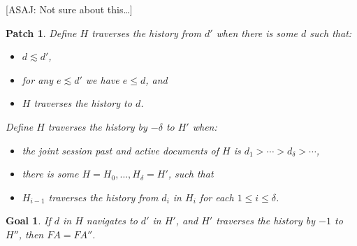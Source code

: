 \documentclass{article}
\newcommand{\aNH}{H}
\newcommand{\FullyActive}{F\!A}
\newcommand{\leChron}{\le}
\newcommand{\gtChron}{>}
\newcommand{\ltSess}{\lesssim}
\newcommand{\aDoc}{d}
\newcommand{\bDoc}{e}
\newtheorem{goal}{Goal}
\newtheorem{patch}{Patch}
\newtheorem{counterexample}{Counterexample}
\begin{document}
[ASAJ: Not sure about this\dots]

\begin{patch}
Define \emph{$\aNH$ traverses the history from $\aDoc'$} when there is some $\aDoc$ such that:
\begin{itemize}
\item $\aDoc\ltSess\aDoc'$,
\item for any $\bDoc\ltSess\aDoc'$ we have $\bDoc\leChron\aDoc$, and
\item $\aNH$ traverses the history to $\aDoc$.
\end{itemize}
Define \emph{$\aNH$ traverses the history by $-\delta$ to $\aNH'$} when:
\begin{itemize}
\item the joint session past and active documents of $\aNH$ is $\aDoc_1 \gtChron \cdots \gtChron \aDoc_\delta \gtChron \cdots$,
\item there is some $\aNH=\aNH_0,\ldots,\aNH_\delta=\aNH'$, such that
\item $H_{i-1}$ traverses the history from $d_i$ in $H_i$ for each $1 \le i \le \delta$.
\end{itemize}
\end{patch}

\begin{goal}
  If $\aDoc$ in $\aNH$ navigates to $\aDoc'$ in $\aNH'$,
  and $\aNH'$ traverses the history by $-1$ to $\aNH''$,
  then $\FullyActive=\FullyActive''$.
\end{goal}

\end{document}
